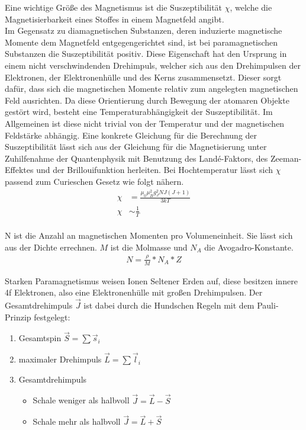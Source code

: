 Eine wichtige Größe des Magnetismus ist die Suszeptibilität $\chi$, welche die Magnetisierbarkeit 
eines Stoffes in einem Magnetfeld angibt.\\ 
Im Gegensatz zu diamagnetischen Substanzen, deren induzierte magnetische Momente dem Magnetfeld 
entgegengerichtet sind, ist bei paramagnetischen Substanzen die Suszeptibilität positiv.
Diese Eigenschaft hat den Ursprung in einem nicht verschwindenden Drehimpuls, welcher sich aus
den Drehimpulsen der Elektronen, der Elektronenhülle und des Kerns zusammensetzt. Dieser sorgt dafür,
dass sich die magnetischen Momente relativ zum angelegten magnetischen Feld ausrichten. Da diese 
Orientierung durch Bewegung der atomaren Objekte gestört wird, besteht eine Temperaturabhängigkeit
der Suszeptibilität. Im Allgemeinen ist diese nicht trivial von der Temperatur und der magnetischen 
Feldstärke abhängig. Eine konkrete Gleichung für die Berechnung der Suszeptibilität lässt sich
aus der Gleichung für die Magnetisierung unter Zuhilfenahme der Quantenphysik mit Benutzung des 
Landé-Faktors, des Zeeman-Effektes und der Brillouifunktion herleiten. Bei Hochtemperatur lässt
sich $\chi$ passend zum Curieschen Gesetz wie folgt nähern.
\begin{align}
\chi&=\frac{\mu_0 \mu_B^2 g_J^2 N J(J+1)}{3 k T} \label{eqn:curie}\\
\chi&\sim \frac{1}{T}
\end{align}
\\
N ist die Anzahl an magnetischen Momenten pro Volumeneinheit. Sie lässt sich aus der Dichte errechnen. $M$ ist die Molmasse und $N_A$ die Avogadro-Konstante.
\begin{align}
N=\frac{\rho}{M}*N_A*Z
\end{align}

Starken Paramagnetismus weisen Ionen Seltener Erden auf, diese besitzen innere 4f Elektronen, also 
eine Elektronenhülle mit großen Drehimpulsen. Der Gesamtdrehimpuls $\vec J$ ist dabei durch die
Hundschen Regeln mit dem Pauli-Prinzip \cite{anleitung} festgelegt:
	\begin{table}[h]
			\begin{enumerate}
				\item Gesamtspin $\vec S=\sum \vec s_i$ 
				\item maximaler Drehimpuls $\vec L=\sum \vec l_i$ 
				\item Gesamtdrehimpuls 
				\begin{itemize}
					\item Schale weniger als halbvoll $\vec J=\vec L - \vec S$
					\item Schale mehr als halbvoll $\vec J=\vec L + \vec S$
				\end{itemize}
			\end{enumerate}
	\label{hund}
	\end{table}
\FloatBarrier